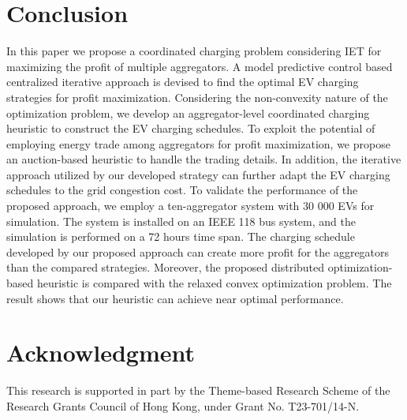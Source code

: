 \documentclass[conference]{IEEEtran}
\begin{document}
    \vspace*{-0.1cm}
	\section{Conclusion}
    \vspace*{-0.2cm}

	In this paper we propose a coordinated charging problem considering IET for maximizing the profit of multiple aggregators. A model predictive control based centralized iterative approach is devised to find the optimal EV charging strategies for profit maximization. Considering the non-convexity nature of the optimization problem, we develop an aggregator-level coordinated charging heuristic to construct the EV charging schedules. To exploit the potential of employing energy trade among aggregators for profit maximization, we propose an auction-based heuristic to handle the trading details. In addition, the iterative approach utilized by our developed strategy can further adapt the EV charging schedules to the grid congestion cost. To validate the performance of the proposed approach, we employ a ten-aggregator system with 30 000 EVs for simulation. The system is installed on an IEEE 118 bus system, and the simulation is performed on a 72 hours time span. The charging schedule developed by our proposed approach can create more profit for the aggregators than the compared strategies. Moreover, the proposed distributed optimization-based heuristic is compared with the relaxed convex optimization problem. The result shows that our heuristic can achieve near optimal performance.
    \vspace{-0.2cm}
	\section*{Acknowledgment} \vspace{-0.2cm}
This research is supported in part by the Theme-based Research Scheme of the Research Grants Council of Hong Kong, under Grant No. T23-701/14-N.



	
\end{document}
